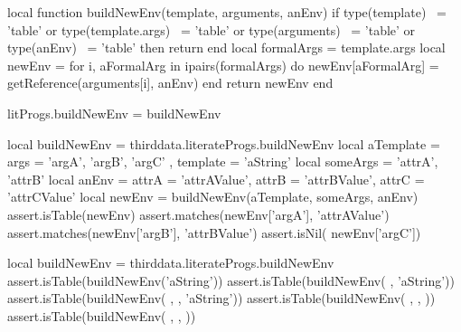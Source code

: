 {{\stopTestSuite

\startTestSuite[renderer]

\startLuaCode
local function buildNewEnv(template, arguments, anEnv)
  if type(template)      ~= 'table' or
     type(template.args) ~= 'table' or
     type(arguments)     ~= 'table' or
     type(anEnv)         ~= 'table' then
    return { }
  end
  local formalArgs = template.args
  local newEnv = { }
  for i, aFormalArg in ipairs(formalArgs) do
    newEnv[aFormalArg] = getReference(arguments[i], anEnv)
  end
  return newEnv
end

litProgs.buildNewEnv = buildNewEnv
\stopLuaCode

\startLuaTest
local buildNewEnv = thirddata.literateProgs.buildNewEnv
local aTemplate = { 
  args = { 'argA', 'argB', 'argC' }, 
  template = 'aString'
}
local someArgs  = { 'attrA', 'attrB' }
local anEnv     = {
  attrA = 'attrAValue',
  attrB = 'attrBValue',
  attrC = 'attrCValue'
}
local newEnv = buildNewEnv(aTemplate, someArgs, anEnv)
assert.isTable(newEnv)
assert.matches(newEnv['argA'], 'attrAValue')
assert.matches(newEnv['argB'], 'attrBValue')
assert.isNil(  newEnv['argC'])
\stopLuaTest
\stopTestCase

\startLuaTest
local buildNewEnv = thirddata.literateProgs.buildNewEnv
assert.isTable(buildNewEnv('aString'))
assert.isTable(buildNewEnv( { }, 'aString'))
assert.isTable(buildNewEnv( { }, { }, 'aString'))
assert.isTable(buildNewEnv( { }, { }, { }))
assert.isTable(buildNewEnv( { { }}, { }, { }))
\stopLuaTest
\stopTestCase

}}
